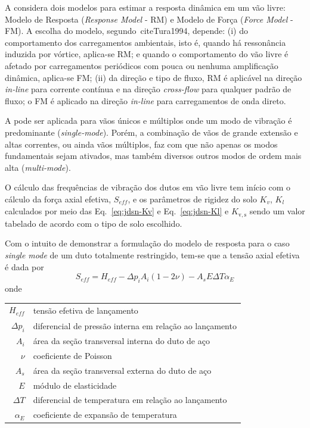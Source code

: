 A  considera dois modelos para estimar a resposta dinâmica em um vão livre: Modelo de Resposta (\textit{Response Model} - RM) e Modelo de Força (\textit{Force Model} - FM).
A escolha do modelo, segundo~cite{Tura1994}, depende:
(i) do comportamento dos carregamentos ambientais, isto é, quando há ressonância induzida por vórtice, aplica-se RM; e quando o comportamento do vão livre é afetado por carregamentos periódicos com pouca ou nenhuma amplificação dinâmica, aplica-se FM;
(ii) da direção e tipo de fluxo, RM é aplicável na direção \textit{in-line} para corrente contínua e na direção \textit{cross-flow} para qualquer padrão de fluxo; o FM é aplicado na direção \textit{in-line} para carregamentos de onda direto.

A  pode ser aplicada para vãos únicos e múltiplos onde um modo de vibração é predominante (\textit{single-mode}).
Porém, a combinação de vãos de grande extensão e altas correntes, ou ainda vãos múltiplos, faz com que não apenas os modos fundamentais sejam ativados, mas também diversos outros modos de ordem mais alta (\textit{multi-mode}).

O cálculo das frequências de vibração dos dutos em vão livre tem início com o cálculo da força axial efetiva, $S_\mathit{eff}$, e os parâmetros de rigidez do solo $K_v$, $K_l$ calculados por meio das Eq.~\eqref{eq:jdsn-Kv} e Eq.~\eqref{eq:jdsn-Kl} e $K_\mathrm{v,s}$ sendo um valor tabelado de acordo com o tipo de solo escolhido.

Com o intuito de demonstrar a formulação do modelo de resposta para o caso \textit{single mode} de um duto totalmente restringido, tem-se que a tensão axial efetiva é dada por
\begin{equation}
\label{eq:jdsn-Seff}
S_\mathit{eff} = H_\mathit{eff} - \Delta p_i A_i (1 - 2\nu) - A_s E \Delta T \alpha_E
\end{equation}
onde

\begin{tabular}{rl}
$H_\mathit{eff}$ & tensão efetiva de lançamento\\
$\Delta p_i$     & diferencial de pressão interna em relação ao lançamento\\
$A_i$            & área da seção transversal interna do duto de aço\\
$\nu$            & coeficiente de Poisson\\
$A_s$            & área da seção transversal externa do duto de aço\\
$E$              & módulo de elasticidade\\
$\Delta T$       & diferencial de temperatura em relação ao lançamento\\
$\alpha_E$       & coeficiente de expansão de temperatura
\end{tabular}

